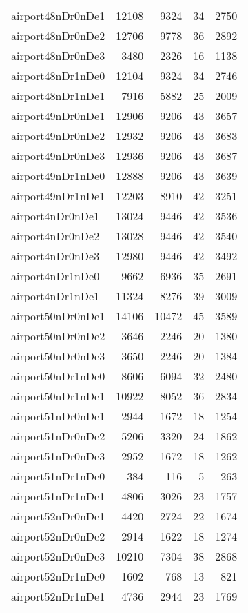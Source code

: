 \begin{longtable}{lrrrr}
airport48nDr0nDe1 & 12108 & 9324 & 34 & 2750 \\
airport48nDr0nDe2 & 12706 & 9778 & 36 & 2892 \\
airport48nDr0nDe3 & 3480 & 2326 & 16 & 1138 \\
airport48nDr1nDe0 & 12104 & 9324 & 34 & 2746 \\
airport48nDr1nDe1 & 7916 & 5882 & 25 & 2009 \\
airport49nDr0nDe1 & 12906 & 9206 & 43 & 3657 \\
airport49nDr0nDe2 & 12932 & 9206 & 43 & 3683 \\
airport49nDr0nDe3 & 12936 & 9206 & 43 & 3687 \\
airport49nDr1nDe0 & 12888 & 9206 & 43 & 3639 \\
airport49nDr1nDe1 & 12203 & 8910 & 42 & 3251 \\
airport4nDr0nDe1 & 13024 & 9446 & 42 & 3536 \\
airport4nDr0nDe2 & 13028 & 9446 & 42 & 3540 \\
airport4nDr0nDe3 & 12980 & 9446 & 42 & 3492 \\
airport4nDr1nDe0 & 9662 & 6936 & 35 & 2691 \\
airport4nDr1nDe1 & 11324 & 8276 & 39 & 3009 \\
airport50nDr0nDe1 & 14106 & 10472 & 45 & 3589 \\
airport50nDr0nDe2 & 3646 & 2246 & 20 & 1380 \\
airport50nDr0nDe3 & 3650 & 2246 & 20 & 1384 \\
airport50nDr1nDe0 & 8606 & 6094 & 32 & 2480 \\
airport50nDr1nDe1 & 10922 & 8052 & 36 & 2834 \\
airport51nDr0nDe1 & 2944 & 1672 & 18 & 1254 \\
airport51nDr0nDe2 & 5206 & 3320 & 24 & 1862 \\
airport51nDr0nDe3 & 2952 & 1672 & 18 & 1262 \\
airport51nDr1nDe0 & 384 & 116 & 5 & 263 \\
airport51nDr1nDe1 & 4806 & 3026 & 23 & 1757 \\
airport52nDr0nDe1 & 4420 & 2724 & 22 & 1674 \\
airport52nDr0nDe2 & 2914 & 1622 & 18 & 1274 \\
airport52nDr0nDe3 & 10210 & 7304 & 38 & 2868 \\
airport52nDr1nDe0 & 1602 & 768 & 13 & 821 \\
airport52nDr1nDe1 & 4736 & 2944 & 23 & 1769 \\

\end{longtable}

